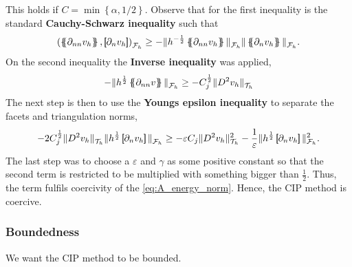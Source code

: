 This holds if $C=\min\left\{  \alpha , 1 /2\right\}$.
Observe that for the first inequality is the standard \textbf{Cauchy-Schwarz inequality} such that $$\left( \mean{ \partial_{nn} v_{h} }  , \jump{ \partial _{n} v_{h} }   \right) _{\mathcal{F} _{h}} \ge - \| h^{-\frac{1}{2}} \mean{ \partial _{nn}
v_{h} }    \|_{\mathcal{F}_{h}   }^{  } \| \mean{ \partial _{n}v_{h} }   \|_{ \mathcal{F}_{h}   }^{  } .  $$ On the second inequality the \textbf{Inverse inequality} was applied,
\[
- \| h^{\frac{1}{2}} \left\{\!\!\left\{ \partial _{nn}v \right\}\!\!\right\}   \|_{ \mathcal{F} _{h}  }^{  }\ge - C_{j}^{\frac{1}{2}} \| D ^2 v_{h} \|_{ \mathcal{T} _{h} }^{  }
\]
The next step is then to use the \textbf{Youngs epsilon inequality} to separate the facets and triangulation norms, \[
 - 2 C^{\frac{1}{2}}_{j} \|  D ^2 v_{h}    \|_{ \mathcal{T} _{h}  }^{  } \| h^{\frac{1}{2}} \jump{ \partial _{n} v_{h} }   \|_{ \mathcal{F} _{h} }^{  } \ge- \varepsilon C_{j} \| D ^2 v_{h} \|_{ \mathcal{T} _{h} }^{2  } -
 \frac{1}{\varepsilon } \| h^{\frac{1}{2}} \jump{ \partial _{n} v_{h} }   \|_{ \mathcal{F} _{h} }^{2  }
.\]
The last step was to choose a $\varepsilon $ and $\gamma $ as some positive constant so that the second term is restricted to be multiplied with something bigger than $\frac{1}{2}$. Thus, the term fulfils coercivity of the \eqref{eq:A_energy_norm}.
Hence, the CIP method is coercive.

\subsubsection{Boundedness}%
\label{ssub:bounded}
We want the CIP method to be bounded.


